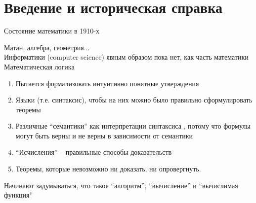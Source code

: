 \section{Введение и историческая справка}



\begin{frame}{Состояние математики в 1910-х}

    Матан, алгебра, геометрия...\\
    Информатики (computer science) явным образом пока нет, как часть математики\\

    Математическая логика
    \begin{enumerate}
      \item Пытается формализовать интуитивно понятные утверждения
      \item Языки (т.е. синтаксис), чтобы на них можно было правильно сформулировать теоремы
      \item Различные ``семантики'' как интерпретации синтаксиса , потому что формулы могут быть верны и не верны в зависимости от семантики
      \item ``Исчисления'' -- правильные способы доказательств
      \item Теоремы, которые невозможно ни доказать, ни опровергнуть.
    \end{enumerate}
  Начинают задумываться, что такое ``алгоритм'', ``вычисление'' и ``вычислимая функция''

\end{frame}

